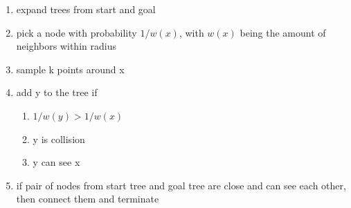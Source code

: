\begin{multicols*}{2}
\begin{enumerate}
	\item expand trees from start and goal
	\item pick a node with probability $1/w(x)$, with $w(x)$ being the amount of neighbors within radius
	\item sample k points around x
	\item add y to the tree if
	\begin{enumerate}
		\item $1/w(y) > 1/w(x)$
		\item y is collision
		\item y can see x
	\end{enumerate}
	\item if pair of nodes from start tree and goal tree are close and can see each other, then connect them and terminate
\end{enumerate}


\end{multicols*}
